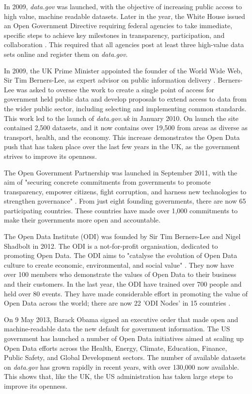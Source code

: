 \documentclass[authoryearcitations]{UoYCSproject}
\begin{document}
In 2009, \textit{data.gov} was launched, with the objective of increasing public access to high value, machine readable datasets. Later in the year, the White House issued an Open Government Directive requiring federal agencies to take immediate, specific steps to achieve key milestones in transparency, participation, and collaboration \citep{Orszag2009}. This required that all agencies post at least three high-value data sets online and register them on \textit{data.gov}.

In 2009, the UK Prime Minister appointed the founder of the World Wide Web, Sir Tim Berners-Lee, as expert advisor on public information delivery \citep{CabinetOffice2009}. Berners-Lee was asked to oversee the work to create a single point of access for government held public data and develop proposals to extend access to data from the wider public sector, including selecting and implementing common standards. This work led to the launch of \textit{data.gov.uk} in January 2010. On launch the site contained 2,500 datasets, and it now contains over 19,500 from areas as diverse as transport, health, and the economy. This increase demonstrates the Open Data push that has taken place over the last few years in the UK, as the government strives to improve its openness.

The Open Government Partnership was launched in September 2011, with the aim of "securing concrete commitments from governments to promote transparency, empower citizens, fight corruption, and harness new technologies to strengthen governance" \citep{OpenGovernmentPartnership}. From just eight founding governments, there are now 65 participating countries. These countries have made over 1,000 commitments to make their governments more open and accountable.

The Open Data Institute (ODI) was founded by Sir Tim Berners-Lee and Nigel Shadbolt in 2012. The ODI is a not-for-profit organisation, dedicated to promoting Open Data. The ODI aims to "catalyse the evolution of Open Data culture to create economic, environmental, and social value" \citep{TheOpenDataInstitute}. They now have over 100 members who demonstrate the values of Open Data to their business and their customers. In the last year, the ODI have trained over 700 people and held over 80 events. They have made considerable effort in promoting the value of Open Data across the world; there are now 22 'ODI Nodes' in 15 countries \citep{TheOpenDataInstitute2015a}.

On 9 May 2013, Barack Obama signed an executive order \citep{TheWhiteHouse-OfficeofthePressSecretary2013} that made open and machine-readable data the new default for government information. The US government has launched a number of Open Data initiatives aimed at scaling up Open Data efforts across the Health, Energy, Climate, Education, Finance, Public Safety, and Global Development sectors. The number of available datasets on \textit{data.gov} has grown rapidly in recent years, with over 130,000 now available. This shows that, like the UK, the US administration has taken large steps to improve its openness.
\end{document}
